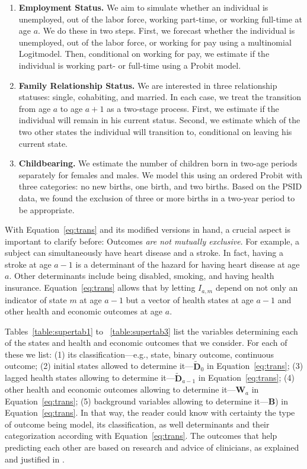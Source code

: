 \begin{enumerate}
\item \textbf{Employment Status.} We aim to simulate whether an individual is unemployed, out of the labor force, working part-time, or working full-time at age $a$. We do these in two steps. First, we forecast whether the individual is unemployed, out of
the labor force, or working for pay using a multinomial Logitmodel. Then, conditional on working for pay, we estimate if the individual is working part- or full-time using a Probit model.
\item \textbf{Family Relationship Status.} We are interested in three relationship statuses: single, cohabiting, and married. In each case, we treat the transition from age $a$ to age $a+1$ as a two-stage process. First, we estimate if the individual will remain in his current status. Second, we estimate which of the two other states the individual will transition to, conditional on leaving his current state.
\item \textbf{Childbearing.} We estimate the number of children born in two-age periods separately for females and males. We model this using an ordered Probit with three categories: no new births, one birth, and two births. Based on the PSID data, we found the exclusion of three or more births in a two-year period to be appropriate.
\end{enumerate}

With Equation~\eqref{eq:trans} and its modified versions in hand, a crucial aspect is important to clarify before: Outcomes \textit{are not mutually exclusive}. For example, a subject can simultaneously have heart disease and a stroke. In fact, having a stroke at age $a-1$ is a determinant of the hazard for having heart disease at age $a$. Other determinants include being disabled, smoking, and having health insurance. Equation~\eqref{eq:trans} allows that by letting $I_{a,m}$ depend on not only an indicator of state $m$ at age $a-1$ but a vector of health states at age $a-1$ and other health and economic outcomes at age $a$. 

Tables~\ref{table:supertab1} to ~\ref{table:supertab3} list the variables determining each of the states and health and economic outcomes that we consider. For each of these we list: (1) its classification---e.g., state, binary outcome, continuous outcome; (2) initial states allowed to determine it---$\tilde{\bm{D}}_0$ in Equation~\eqref{eq:trans}; (3) lagged health states allowing to determine it---$\tilde{\bm{D}}_{a-1}$ in Equation~\eqref{eq:trans}; (4) other health and economic outcomes allowing to determine it---$\bm{W}_a$ in Equation~\eqref{eq:trans}; (5) background variables allowing to determine it---$\bm{B}$) in Equation~\eqref{eq:trans}. In that way, the reader could know with certainty the type of outcome being model, its classification, as well determinants and their categorization according with Equation~\eqref{eq:trans}. The outcomes that help predicting each other are based on research and advice of clinicians, as explained and justified in \citet{Goldman_etal_2015_Future-Elderly-Model-Report}.

